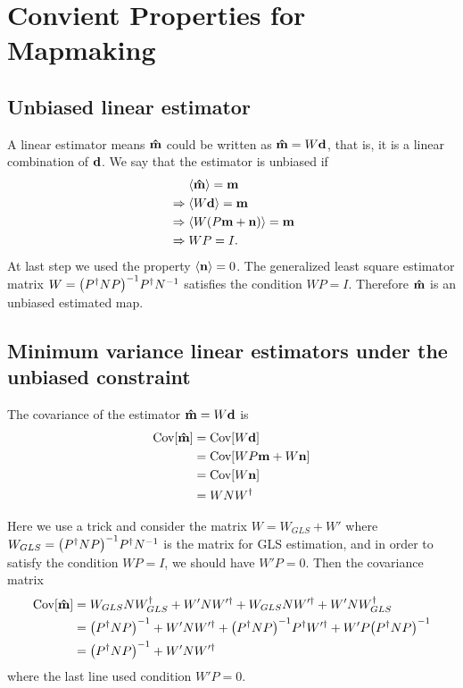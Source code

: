 \documentclass[11pt, letterpaper]{article}
\newcommand{\Cov}[1]{\text{Cov}\qty[#1]}
\newcommand{\vbd}{\vb{d}}
\newcommand{\vbm}{\vb{m}}
\newcommand{\vbn}{\vb{n}}
\newcommand{\inv}[1]{#1^{-1}}
\newcommand{\hatm}{\vb{\hat{m}}}
\newcommand{\Pdagger}{P^{\dagger}}
\newcommand{\PPinv}[1]{\inv{\qty(\Pdagger #1 P)}}
\begin{document}
\section{Convient Properties for Mapmaking}

\subsection{Unbiased linear estimator}
A linear estimator means $\hatm$ could be written as $\hatm = W\vbd$, that is, 
it is a linear combination of $\vbd$.
We say that the estimator is unbiased if
\begin{align}
\begin{aligned}[b]
&\mathrel{\phantom{\Rightarrow}}\ev{\hatm} = \vbm \\
&\Rightarrow\ev{W \vbd} = \vbm\\
&\Rightarrow\ev{W(P\vbm + \vbn) } = \vbm \\
&\Rightarrow WP = I.
\end{aligned}
\end{align}
At last step we used the property  $\ev{\vbn} = 0$.
The generalized least square estimator matrix 
$W = \PPinv{N} \Pdagger \inv{N}  $ satisfies the condition $WP=I$.
Therefore $\hatm$ is an unbiased estimated map.


\subsection{Minimum variance linear estimators under the unbiased constraint} \label{minimize variance}
The covariance of the estimator $\hatm = W \vbd$ is
\begin{align}
\begin{aligned}[b]
\Cov{\hatm} &= \Cov{W\vbd} 
\\ 
&= \Cov{WP\vbm + W\vbn} 
\\ 
&= \Cov{W\vbn} 
\\ 
&= W N W^{\dagger} \label{covariance hatm}
\end{aligned}
\end{align}

Here we use a trick \cite{weighted_and_GLS} and consider the matrix $W = W_{GLS} + W'$ where
$W_{GLS} = \PPinv{N} \Pdagger \inv{N} $ is the matrix for GLS estimation,
and in order to satisfy the condition $WP = I$, we should have $W'P = 0$.
Then the covariance matrix
\begin{align}
\begin{aligned}[b]
\Cov{\hatm }
&= W_{GLS} N W_{GLS}^{\dagger} + W' N W'^{\dagger} 
    + W_{GLS} N W'^{\dagger} + W' N W_{GLS}^{\dagger}
\\
&= \PPinv{N} + W' N W'^{\dagger} 
    + \PPinv{N} \Pdagger W'^{\dagger} + W' P \PPinv{N}
\\
&= \PPinv{N} + W' N W'^{\dagger} 
\end{aligned}
\end{align}
where the last line used condition $W'  P = 0$.
\end{document}
